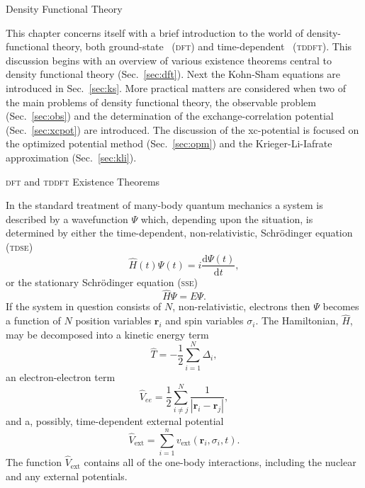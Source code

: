 \documentclass[letterpaper, 11 pt]{report}
\begin{document}
\begin{chapter}{Density Functional Theory \label{chap:dft}}

   This chapter concerns itself with a brief introduction to the world of density-functional theory,
   both ground-state~\cite{dft-engel} (\textsc{dft}) and time-dependent~\cite{tddft, marques-1}
   (\textsc{tddft}). This discussion begins with an overview  of various existence theorems central to
   density functional theory (Sec.~\ref{sec:dft}). Next the Kohn-Sham equations are introduced in
   Sec.~\ref{sec:ks}. More practical matters are considered when two of the main problems of density
   functional theory, the observable problem (Sec.~\ref{sec:obs}) and the determination of the
   exchange-correlation potential (Sec.~\ref{sec:xcpot}) are introduced. The discussion of the
   xc-potential is focused on the optimized potential method (Sec.~\ref{sec:opm}) and the
   Krieger-Li-Iafrate approximation (Sec.~\ref{sec:kli}).

   \begin{section}{\textsc{dft} and \textsc{tddft} Existence Theorems \label{sec:dft}}

      In the standard treatment of many-body quantum mechanics a system is described by a wavefunction
      $\Psi$ which, depending upon the situation, is determined by either the time-dependent,
      non-relativistic, Schr\"{o}dinger equation (\textsc{tdse})
      \begin{equation} \label{eq:tdse}
         \hat{H}(t) \Psi(t) = i \frac{\mathrm{d} \Psi(t)}{\mathrm{d} t},
      \end{equation}
      or the stationary Schr\"{o}dinger equation (\textsc{sse})
      \begin{equation} \label{eq:sse}
         \hat{H} \Psi = E \Psi.
      \end{equation}
      If the system in question consists of $N$, non-relativistic, electrons then $\Psi$ becomes a
      function of $N$ position variables $\mathbf{r}_i$ and spin variables $\sigma_i$. The Hamiltonian,
      $\hat{H}$, may be decomposed into a kinetic energy term
      \begin{equation} \label{eq:Top} %
         \hat{T} = -\frac{1}{2} \sum\limits^{N}_{i=1} \Delta_i,
      \end{equation}
      an electron-electron term
      \begin{equation} \label{eq:Vee} %
         \hat{V}_{ee} = \frac{1}{2} \sum\limits^{N}_{i \neq j}
                        \frac{1}{\left| \mathbf{r}_i - \mathbf{r}_j \right|},
      \end{equation}
      and a, possibly, time-dependent external potential
      \begin{equation} \label{eq:Vext}
         \hat{V}_\mathrm{ext} = \sum\limits^{n}_{i = 1} v_\mathrm{ext} (\mathbf{r}_i, \sigma_i, t).
      \end{equation}
      The function $\hat{V}_\mathrm{ext}$ contains all of the one-body interactions, including the
      nuclear and any external potentials.


\end{section}
\end{chapter}
\end{document}
